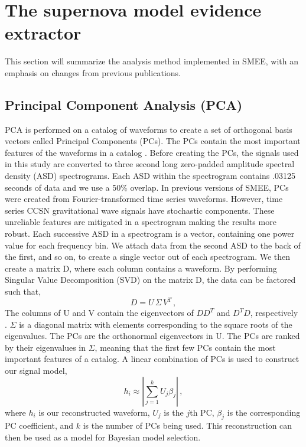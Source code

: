 \documentclass[letterpaper, aps, prd, twocolumn, superscriptaddress, showpacs, nofootinbib]{revtex4}
\begin{document}
\section{The supernova model evidence extractor}
\label{sec:smee}

This section will summarize the analysis method implemented in SMEE, with an emphasis on changes from previous publications. %

\subsection{Principal Component Analysis (PCA)}

PCA is performed on a catalog of waveforms to create a set of orthogonal basis vectors called Principal Components (PCs). The PCs contain the most important features of the waveforms in a catalog \cite{logue:12, powell:16b, 2017PhRvD..96l3013P, heng:09}. Before creating the PCs, the signals used in this study are converted to three second long zero-padded amplitude spectral density (ASD) spectrograms. Each ASD within the spectrogram contains .03125 seconds of data and we use a 50\% overlap. In previous versions of SMEE, PCs were created from Fourier-transformed time series waveforms. However, time series CCSN gravitational wave signals have stochastic components. These unreliable features are mitigated in a spectrogram making the results more robust. Each successive ASD in a spectrogram is a vector, containing one power value for each frequency bin. We attach data from the second ASD to the back of the first, and so on, to create a single vector out of each spectrogram. We then create a matrix D, where each column contains a waveform. By performing Singular Value Decomposition (SVD) on the matrix D, the data can be factored such that,
\begin{equation}
D = U\,\Sigma\,V^{T}\,,
\end{equation}
The columns of U and V contain the eigenvectors of $DD^{T}$ and $D^{T} D$, respectively \cite{heng:09}. $\Sigma$ is a diagonal matrix with elements corresponding to the square roots of the eigenvalues. The PCs are the orthonormal eigenvectors in U. The PCs are ranked by their eigenvalues in $\Sigma$, meaning that the first few PCs contain the most important features of a catalog. A linear combination of PCs is used to construct our signal model, 
\begin{equation}
h_i \approx | \sum_{j=1}^{k} U_j \beta_j | \,,
\label{equ:linear_sum}
\end{equation}
where $h_i$ is our reconstructed waveform, $U_j$ is the $j$th PC, $\beta_j$ is the corresponding PC coefficient, and $k$ is the number of PCs being used. This reconstruction can then be used as a model for Bayesian model selection.
\end{document}
